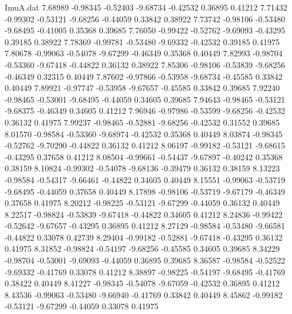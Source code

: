 \begin{filecontents}{ImuA.dat}
   7.68989   -0.98345   -0.52403   -9.68734   -0.42532    0.36895    0.41212
   7.71432   -0.99302   -0.53121   -9.68256   -0.44059    0.33842    0.38922
   7.73742   -0.98106   -0.53480   -9.68495   -0.41005    0.35368    0.39685
   7.76050   -0.99422   -0.52762   -9.69093   -0.43295    0.39185    0.38922
   7.78369   -0.99781   -0.53480   -9.69332   -0.42532    0.39185    0.41975
   7.80678   -0.99063   -0.54078   -9.67299   -0.46349    0.35368    0.40449
   7.82993   -0.98704   -0.53360   -9.67418   -0.44822    0.36132    0.38922
   7.85306   -0.98106   -0.53839   -9.68256   -0.46349    0.32315    0.40449
   7.87602   -0.97866   -0.53958   -9.68734   -0.45585    0.33842    0.40449
   7.89921   -0.97747   -0.53958   -9.67657   -0.45585    0.33842    0.39685
   7.92240   -0.98465   -0.53001   -9.68495   -0.44059    0.34605    0.39685
   7.94643   -0.98465   -0.53121   -9.68375   -0.46349    0.34605    0.41212
   7.96946   -0.97986   -0.53599   -9.68256   -0.42532    0.36132    0.41975
   7.99237   -0.98465   -0.52881   -9.68256   -0.42532    0.31552    0.39685
   8.01570   -0.98584   -0.53360   -9.68974   -0.42532    0.35368    0.40449
   8.03874   -0.98345   -0.52762   -9.70290   -0.44822    0.36132    0.41212
   8.06197   -0.99182   -0.53121   -9.68615   -0.43295    0.37658    0.41212
   8.08504   -0.99661   -0.54437   -9.67897   -0.40242    0.35368    0.38159
   8.10824   -0.99302   -0.54078   -9.68136   -0.39479    0.36132    0.38159
   8.13223   -0.98584   -0.54317   -9.66461   -0.44822    0.34605    0.40449
   8.15551   -0.99063   -0.53719   -9.68495   -0.44059    0.37658    0.40449
   8.17898   -0.98106   -0.53719   -9.67179   -0.46349    0.37658    0.41975
   8.20212   -0.98225   -0.53121   -9.67299   -0.44059    0.36132    0.40449
   8.22517   -0.98824   -0.53839   -9.67418   -0.44822    0.34605    0.41212
   8.24836   -0.99422   -0.52642   -9.67657   -0.43295    0.36895    0.41212
   8.27129   -0.98584   -0.53480   -9.66581   -0.44822    0.33078    0.42739
   8.29404   -0.99182   -0.52881   -9.67418   -0.43295    0.36132    0.41975
   8.31852   -0.98824   -0.54197   -9.68256   -0.45585    0.34605    0.39685
   8.34229   -0.98704   -0.53001   -9.69093   -0.44059    0.36895    0.39685
   8.36587   -0.98584   -0.52522   -9.69332   -0.41769    0.33078    0.41212
   8.38897   -0.98225   -0.54197   -9.68495   -0.41769    0.38422    0.40449
   8.41227   -0.98345   -0.54078   -9.67059   -0.42532    0.36895    0.41212
   8.43536   -0.99063   -0.53480   -9.66940   -0.41769    0.33842    0.40449
   8.45862   -0.99182   -0.53121   -9.67299   -0.44059    0.33078    0.41975

\end{filecontents}
